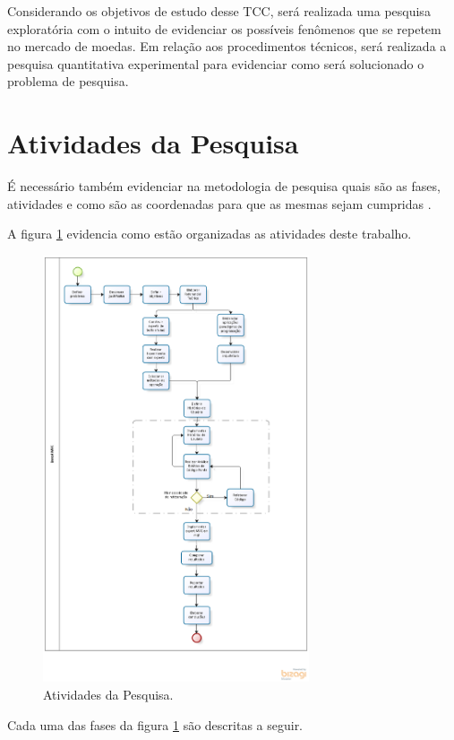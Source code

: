 Considerando os objetivos de estudo desse TCC, será realizada uma pesquisa exploratória com o intuito de evidenciar os possíveis fenômenos que se repetem no mercado de moedas. Em relação aos procedimentos técnicos, será realizada a pesquisa quantitativa experimental para evidenciar como será solucionado o problema de pesquisa.

\section{Atividades da Pesquisa}

É necessário também evidenciar na metodologia de pesquisa quais são as fases, atividades e como são as coordenadas para que as mesmas sejam cumpridas \cite{forcon2014}.

A figura \ref{metodologia} evidencia como estão organizadas as atividades deste trabalho.

\begin{figure}[H]
\centering
\includegraphics[width=0.7\textwidth]{figuras/metodologia}
\caption{Atividades da Pesquisa.} 
\label{metodologia}
\end{figure}

Cada uma das fases da figura \ref{metodologia} são descritas a seguir.

